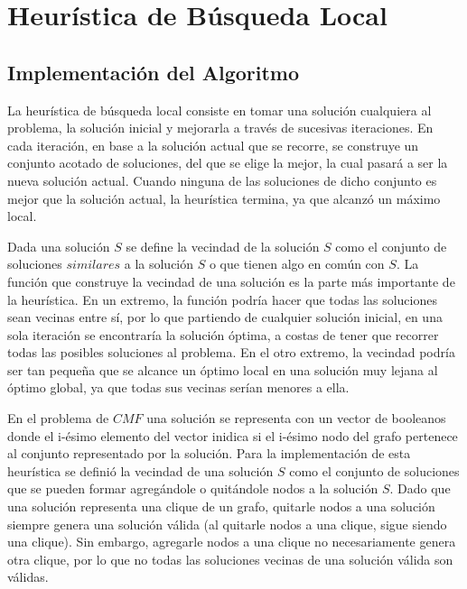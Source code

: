 \section{Heurística de Búsqueda Local}
\subsection{Implementación del Algoritmo}

\par{La heurística de búsqueda local consiste en tomar una solución cualquiera
al problema, la solución inicial y mejorarla a través de sucesivas iteraciones.
En cada iteración, en base a la solución actual que se recorre, se construye un
conjunto acotado de soluciones, del que se elige la mejor, la cual pasará a
ser la nueva solución actual. Cuando ninguna de las soluciones de dicho
conjunto es mejor que la solución actual, la heurística termina, ya que alcanzó
un máximo local.}\\

\par{Dada una solución $S$ se define la vecindad de
la solución $S$ como el conjunto de soluciones $similares$ a la solución $S$
o que tienen algo en común con $S$. La función que construye la vecindad de
una solución es la parte más importante de la heurística. En un extremo, la
función podría hacer que todas las soluciones sean vecinas entre sí, por lo que
partiendo de cualquier solución inicial, en una sola iteración se encontraría
la solución óptima, a costas de tener que recorrer todas las posibles
soluciones al problema. En el otro extremo, la vecindad podría ser tan pequeña
que se alcance un óptimo local en una solución muy lejana al óptimo global, ya
que todas sus vecinas serían menores a ella.}\\

\par{En el problema de $CMF$ una solución se representa con un vector de
booleanos donde el i-ésimo elemento del vector inidica si el i-ésimo nodo
del grafo pertenece al conjunto representado por la solución. Para la
implementación de esta heurística se definió la vecindad de una solución $S$
como el conjunto de soluciones que se pueden formar agregándole o quitándole
nodos a la solución $S$. Dado que una solución representa una clique de un
grafo, quitarle nodos a una solución siempre genera una solución válida (al
quitarle nodos a una clique, sigue siendo una clique). Sin embargo, agregarle
nodos a una clique no necesariamente genera otra clique, por lo que no todas
las soluciones vecinas de una solución válida son válidas.}\\


